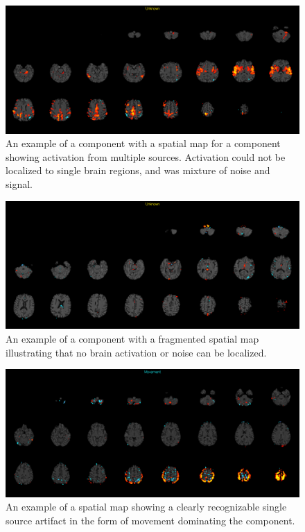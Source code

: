 \begin{figure}[H]                 
	\includegraphics[width=.8\textwidth]{figures/bMethods/Unknown}  
	\caption{An example of a  component with a spatial map for a component showing activation from multiple sources. Activation could not be localized to single brain regions, and was mixture of noise and signal.}
	\label{fig:meth:Unknown} 
\end{figure}

\begin{figure}[H]                 
	\includegraphics[width=.8\textwidth]{figures/bMethods/Frag}  
	\caption{An example of a component with a fragmented spatial map illustrating that no brain activation or noise can be localized.}
	\label{fig:meth:Frag} 
\end{figure}

\begin{figure}[H]                 
	\includegraphics[width=.8\textwidth]{figures/bMethods/Movement}  
	\caption{An example of a spatial map showing a clearly recognizable single source artifact in the form of movement dominating the component.}
	\label{fig:meth:Movement} 
\end{figure}






 